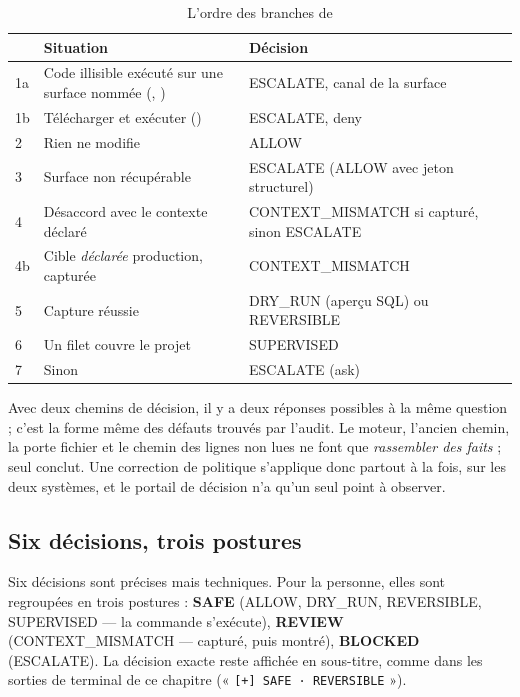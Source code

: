 \begin{table}[htbp]
\centering
\caption{L'ordre des branches de }
\label{tab:ordre}
\small
\begin{tabularx}{\linewidth}{@{}L{0.6cm}YL{4.0cm}@{}}
\toprule
& \textbf{Situation} & \textbf{Décision} \\
\midrule
1a & Code illisible exécuté sur une surface nommée (, ) &
  ESCALATE, canal de la surface \\
1b & Télécharger et exécuter () & ESCALATE, deny \\
2 & Rien ne modifie & ALLOW \\
3 & Surface non récupérable & ESCALATE (ALLOW avec jeton structurel) \\
4 & Désaccord avec le contexte déclaré & CONTEXT\_MISMATCH si capturé, sinon ESCALATE \\
4b & Cible \emph{déclarée} production, capturée & CONTEXT\_MISMATCH \\
5 & Capture réussie & DRY\_RUN (aperçu SQL) ou REVERSIBLE \\
6 & Un filet couvre le projet & SUPERVISED \\
7 & Sinon & ESCALATE (ask) \\
\bottomrule
\end{tabularx}
\end{table}

\begin{pourquoi}
Avec deux chemins de décision, il y a deux réponses possibles à la même question ; c'est la
forme même des défauts trouvés par l'audit. Le moteur, l'ancien chemin, la porte fichier et
le chemin des lignes non lues ne font que \emph{rassembler des faits} ; seul
 conclut. Une correction de politique s'applique donc partout à la fois,
sur les deux systèmes, et le portail de décision n'a qu'un seul point à observer.
\end{pourquoi}

\subsection{Six décisions, trois postures}
Six décisions sont précises mais techniques. Pour la personne, elles sont regroupées en trois
postures : \textbf{SAFE} (ALLOW, DRY\_RUN, REVERSIBLE, SUPERVISED --- la commande
s'exécute), \textbf{REVIEW} (CONTEXT\_MISMATCH --- capturé, puis montré), \textbf{BLOCKED}
(ESCALATE). La décision exacte reste affichée en sous-titre, comme dans les sorties de
terminal de ce chapitre (« \texttt{[+] SAFE · REVERSIBLE} »).

